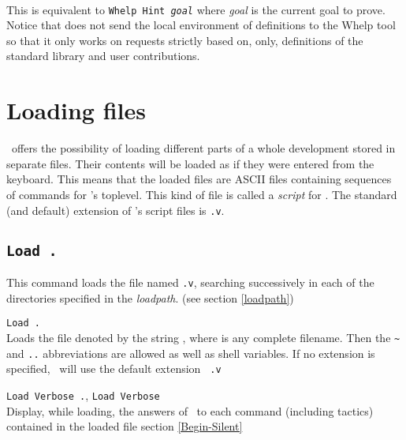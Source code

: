 \\ This is equivalent to {\tt Whelp Hint
{\sl goal}} where {\sl goal} is the current goal to prove. Notice that
{\Coq} does not send the local environment of definitions to the {\sc
Whelp} tool so that it only works on requests strictly based on, only,
definitions of the standard library and user contributions.

\section{Loading files}

\Coq\ offers the possibility of loading different
parts of a whole development stored in separate files. Their contents
will be loaded as if they were entered from the keyboard. This means
that the loaded files are ASCII files containing sequences of commands
for \Coq's toplevel. This kind of file is called a {\em script} for
\Coq{}. The standard (and default) extension of
\Coq's script files is {\tt .v}.

\subsection{\tt Load {\ident}.}
\label{Load}
This command loads the file named {\ident}{\tt .v}, searching
successively in each of the directories specified in the {\em
  loadpath}. (see section \ref{loadpath})

\begin{Variants}
\item {\tt Load {\str}.}\label{Load-str}\\
  Loads the file denoted by the string {\str}, where {\str} is any
  complete filename. Then the \verb.~. and {\tt ..}
  abbreviations are allowed as well as shell variables. If no
  extension is specified, \Coq\ will use the default extension {\tt
    .v}
\item {\tt Load Verbose {\ident}.}, 
  {\tt Load Verbose {\str}}\\
  Display, while loading, the answers of \Coq\ to each command
  (including tactics) contained in the loaded file
  \SeeAlso section \ref{Begin-Silent}
\end{Variants}

\begin{ErrMsgs}
\item {}
\end{ErrMsgs}

